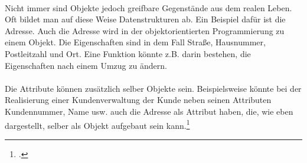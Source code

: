 \\
Nicht immer sind Objekte jedoch greifbare Gegenstände aus dem realen Leben. Oft bildet man auf diese Weise Datenstrukturen ab. Ein Beispiel dafür ist die Adresse. Auch die Adresse wird in der objektorientierten Programmierung zu einem Objekt. Die Eigenschaften sind in dem Fall Straße, Hausnummer, Postleitzahl und Ort. Eine Funktion könnte z.B. darin bestehen, die Eigenschaften nach einem Umzug zu ändern.\\
\\
Die Attribute können zusätzlich selber Objekte sein. Beispielsweise könnte bei der Realisierung einer Kundenverwaltung der Kunde neben seinen Attributen Kundennummer, Name usw. auch die Adresse als Attribut haben, die, wie eben dargestellt, selber als Objekt aufgebaut sein kann.\footcite{shit_java_tut}

